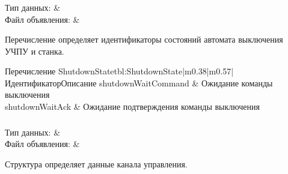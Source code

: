 \subsubsection{}
\label{sec:ShutdownState}

\begin{fHeader}
    Тип данных:            & \\
    Файл объявления:             &  \\
\end{fHeader}

Перечисление определяет идентификаторы состояний автомата выключения УЧПУ и станка.

\begin{MyTableTwoColAllCntr}{Перечисление ShutdownState}{tbl:ShutdownState}{|m{0.38\linewidth}|m{0.57\linewidth}|}{Идентификатор}{Описание}
\hline shutdownWaitCommand &  Ожидание команды выключения \\
\hline shutdownWaitAck &  Ожидание подтверждения команды выключения \\
\end{MyTableTwoColAllCntr}

\subsubsection{}
\label{sec:ChannelInfo}

\begin{fHeader}
    Тип данных:            & \\
    Файл объявления:             &  \\
\end{fHeader}

Структура определяет данные канала управления.

